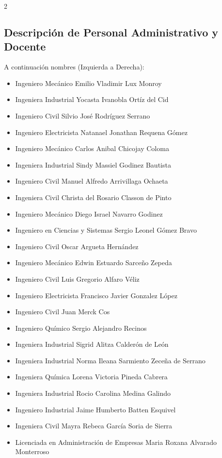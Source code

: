 \documentclass[11pt,spanish,Letterpaper,openany]{book}
\begin{document}
\begin {multicols}{2}

\hypertarget{descripcion-de-personal-administrativo-y-docente}{%
\subsection*{Descripción de Personal Administrativo y Docente}\label{descripcion-de-personal-administrativo-y-docente}}

A continuación nombres (Izquierda a Derecha):

\begin{itemize}
\item
  Ingeniero Mecánico Emilio Vladimir Lux Monroy
\item
  Ingeniera Industrial Yocasta Ivanobla Ortíz del Cid
\item
  Ingeniero Civil Silvio José Rodríguez Serrano
\item
  Ingeniero Electricista Natanael Jonathan Requena Gómez
\item
  Ingeniero Mecánico Carlos Anibal Chicojay Coloma
\item
  Ingeniera Industrial Sindy Massiel Godinez Bautista
\item
  Ingeniero Civil Manuel Alfredo Arrivillaga Ochaeta
\item
  Ingeniera Civil Christa del Rosario Classon de Pinto
\item
  Ingeniero Mecánico Diego Israel Navarro Godinez
\item
  Ingeniero en Ciencias y Sistemas Sergio Leonel Gómez Bravo
\item
  Ingeniero Civil Oscar Argueta Hernández
\item
  Ingeniero Mecánico Edwin Estuardo Sarceño Zepeda
\item
  Ingeniero Civil Luis Gregorio Alfaro Véliz
\item
  Ingeniero Electricista Francisco Javier Gonzalez López
\item
  Ingeniero Civil Juan Merck Cos
\item
  Ingeniero Químico Sergio Alejandro Recinos
\item
  Ingeniera Industrial Sigrid Alitza Calderón de León
\item
  Ingeniera Industrial Norma Ileana Sarmiento Zeceña de Serrano
\item
  Ingeniera Química Lorena Victoria Pineda Cabrera
\item
  Ingeniera Industrial Rocio Carolina Medina Galindo
\item
  Ingeniero Industrial Jaime Humberto Batten Esquivel
\item
  Ingeniera Civil Mayra Rebeca García Soria de Sierra
\item
  Licenciada en Administración de Empresas Maria Roxana Alvarado Monterroso
\end{itemize}

\end {multicols}
\end{document}
